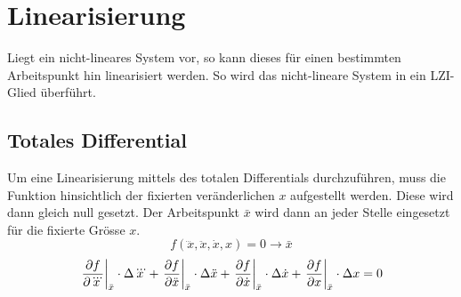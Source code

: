 \section{Linearisierung}
Liegt ein nicht-lineares System vor, so kann dieses für einen
bestimmten Arbeitspunkt hin linearisiert werden. So wird das
nicht-lineare System in ein LZI-Glied überführt.

\subsection{Totales Differential}
Um eine Linearisierung mittels des totalen Differentials durchzuführen,
muss die Funktion hinsichtlich der fixierten veränderlichen $x$ 
aufgestellt werden. Diese wird dann gleich null gesetzt. 
Der Arbeitspunkt $\bar{x}$ wird dann an jeder Stelle eingesetzt für die 
fixierte Grösse $x$. 
\[ 
    f(\dddot{x}, \ddot{x}, \dot{x}, x) = 0 \rightarrow \bar{x}
\]
\[ 
    \begin{array}{r l} 
		\displaystyle 
            \left. \frac{\partial f}{\partial \dddot{x}}
                \right\rvert_{\bar{x}} \cdot \Delta \dddot{x}
            + \left.\frac{\partial f}{\partial \ddot{x}}
                \right\rvert_{\bar{x}} \cdot \Delta \ddot{x}
            + \left.\frac{\partial f}{\partial \dot{x}}
                \right\rvert_{\bar{x}} \cdot \Delta \dot{x}
            + \left.\frac{\partial f}{\partial x}
                \right\rvert_{\bar{x}} \cdot \Delta x 
            = 0\\
    \end{array} 
\]

